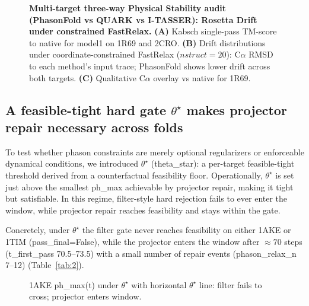 \begin{figure}[t]
  \centering
  \caption{\textbf{Multi-target three-way Physical Stability audit (PhasonFold vs QUARK vs I-TASSER): Rosetta Drift under constrained FastRelax.}
  \textbf{(A)} Kabsch single-pass TM-score to native for model1 on 1R69 and 2CRO.
  \textbf{(B)} Drift distributions under coordinate-constrained FastRelax ($nstruct=20$): C$\alpha$ RMSD to each method's input trace; PhasonFold shows lower drift across both targets.
  \textbf{(C)} Qualitative C$\alpha$ overlay vs native for 1R69.}
  \label{fig:5}
\end{figure}

\subsection{A feasible-tight hard gate $\theta^\star$ makes projector repair necessary across folds}

To test whether phason constraints are merely optional regularizers or enforceable dynamical conditions, we introduced $\theta^\star$ (theta\_star): a per-target feasible-tight threshold derived from a counterfactual feasibility floor. Operationally, $\theta^\star$ is set just above the smallest ph\_max achievable by projector repair, making it tight but satisfiable. In this regime, filter-style hard rejection fails to ever enter the window, while projector repair reaches feasibility and stays within the gate.

\begin{table}[t]
  \centering
  \caption{$\theta^\star$ hard-gate feasibility: filter vs projector repair.}
  \label{tab:2}
\end{table}

Concretely, under $\theta^\star$ the filter gate never reaches feasibility on either 1AKE or 1TIM (pass\_final=False), while the projector enters the window after \(\approx 70\) steps (t\_first\_pass 70.5–73.5) with a small number of repair events (phason\_relax\_n 7–12) (Table~\ref{tab:2}).

\begin{figure}[t]
  \centering
  \caption{1AKE ph\_max(t) under $\theta^\star$ with horizontal $\theta^\star$ line: filter fails to cross; projector enters window.}
  \label{fig:6}
\end{figure}

